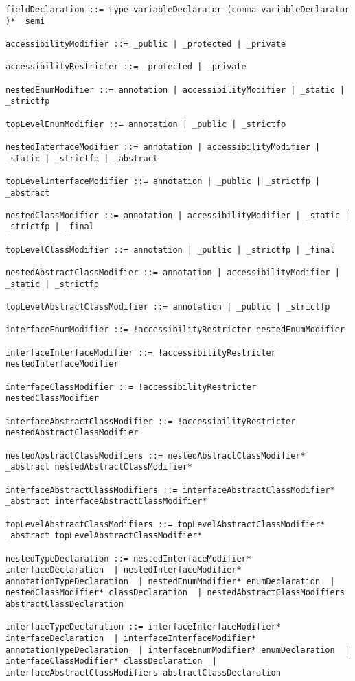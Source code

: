 \begin{lstlisting}[breaklines=true]
fieldDeclaration ::= type variableDeclarator (comma variableDeclarator )*  semi

accessibilityModifier ::= _public | _protected | _private

accessibilityRestricter ::= _protected | _private

nestedEnumModifier ::= annotation | accessibilityModifier | _static | _strictfp

topLevelEnumModifier ::= annotation | _public | _strictfp

nestedInterfaceModifier ::= annotation | accessibilityModifier | _static | _strictfp | _abstract

topLevelInterfaceModifier ::= annotation | _public | _strictfp | _abstract

nestedClassModifier ::= annotation | accessibilityModifier | _static | _strictfp | _final

topLevelClassModifier ::= annotation | _public | _strictfp | _final

nestedAbstractClassModifier ::= annotation | accessibilityModifier | _static | _strictfp

topLevelAbstractClassModifier ::= annotation | _public | _strictfp

interfaceEnumModifier ::= !accessibilityRestricter nestedEnumModifier

interfaceInterfaceModifier ::= !accessibilityRestricter nestedInterfaceModifier

interfaceClassModifier ::= !accessibilityRestricter nestedClassModifier

interfaceAbstractClassModifier ::= !accessibilityRestricter nestedAbstractClassModifier

nestedAbstractClassModifiers ::= nestedAbstractClassModifier* _abstract nestedAbstractClassModifier*

interfaceAbstractClassModifiers ::= interfaceAbstractClassModifier* _abstract interfaceAbstractClassModifier*

topLevelAbstractClassModifiers ::= topLevelAbstractClassModifier* _abstract topLevelAbstractClassModifier*

nestedTypeDeclaration ::= nestedInterfaceModifier* interfaceDeclaration  | nestedInterfaceModifier* annotationTypeDeclaration  | nestedEnumModifier* enumDeclaration  | nestedClassModifier* classDeclaration  | nestedAbstractClassModifiers abstractClassDeclaration

interfaceTypeDeclaration ::= interfaceInterfaceModifier* interfaceDeclaration  | interfaceInterfaceModifier* annotationTypeDeclaration  | interfaceEnumModifier* enumDeclaration  | interfaceClassModifier* classDeclaration  | interfaceAbstractClassModifiers abstractClassDeclaration


\end{lstlisting}
